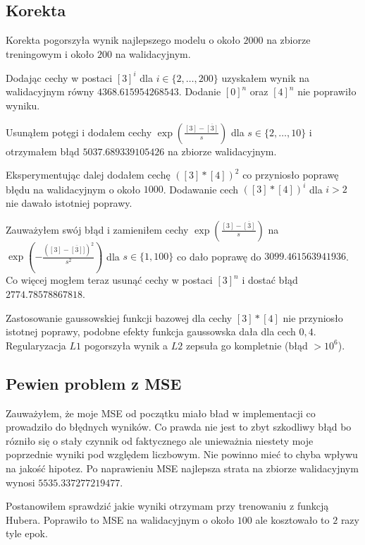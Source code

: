\documentclass{article}
\begin{document}
  \subsection{Korekta}
  Korekta pogorszyła wynik najlepszego modelu o około $2000$ na zbiorze treningowym i około $200$ na walidacyjnym.

  Dodając cechy w postaci $[3]^i$ dla $i\in\{2,\ldots, 200\}$ uzyskałem wynik na walidacyjnym równy $4368.615954268543$. 
  Dodanie $[0]^n$ oraz $[4]^n$ nie poprawiło wyniku.

  Usunąłem potęgi i dodałem cechy $\exp\left(\frac{[3]-\overline{[3]}}{s}\right)$ dla $s\in\{2,\ldots,10\}$ i otrzymałem błąd
  $5037.689339105426$ na zbiorze walidacyjnym.

  Eksperymentując dalej dodałem cechę $([3]*[4])^2$ co przyniosło poprawę błędu na walidacyjnym o około $1000$. 
  Dodawanie cech $([3]*[4])^i$ dla $i > 2$ nie dawało istotniej poprawy.

  Zauważyłem swój błąd i zamieniłem cechy $\exp\left(\frac{[3]-\overline{[3]}}{s}\right)$ na $\exp\left(-\frac{\left([3]-\overline{[3]}]\right)^2}{s^2}\right)$ dla $s\in\{1, 100\}$ 
  co dało poprawę do $3099.461563941936$. Co więcej mogłem teraz usunąć cechy w postaci $[3]^n$ i dostać błąd $2774.78578867818$.

  Zastosowanie gaussowskiej funkcji bazowej dla cechy $[3]*[4]$ nie przyniosło istotnej poprawy, podobne efekty funkcja gaussowska dała dla cech $0, 4$. 
  Regularyzacja $L1$ pogorszyła wynik a $L2$ zepsuła go kompletnie (błąd $>10^6$).

  \subsection{Pewien problem z MSE}
  Zauważyłem, że moje MSE od początku miało bład w implementacji co prowadziło do błędnych wyników. 
  Co prawda nie jest to zbyt szkodliwy błąd bo rózniło się o stały czynnik od faktycznego ale unieważnia niestety moje poprzednie wyniki pod względem liczbowym. 
  Nie powinno mieć to chyba wpływu na jakość hipotez. Po naprawieniu MSE najlepsza strata na zbiorze walidacyjnym wynosi $5535.337277219477$.

  \vspace{5pt}

  Postanowiłem sprawdzić jakie wyniki otrzymam przy trenowaniu z funkcją Hubera. Poprawiło to MSE na walidacyjnym o około $100$ ale kosztowało to $2$ razy tyle epok.
  
\end{document}
